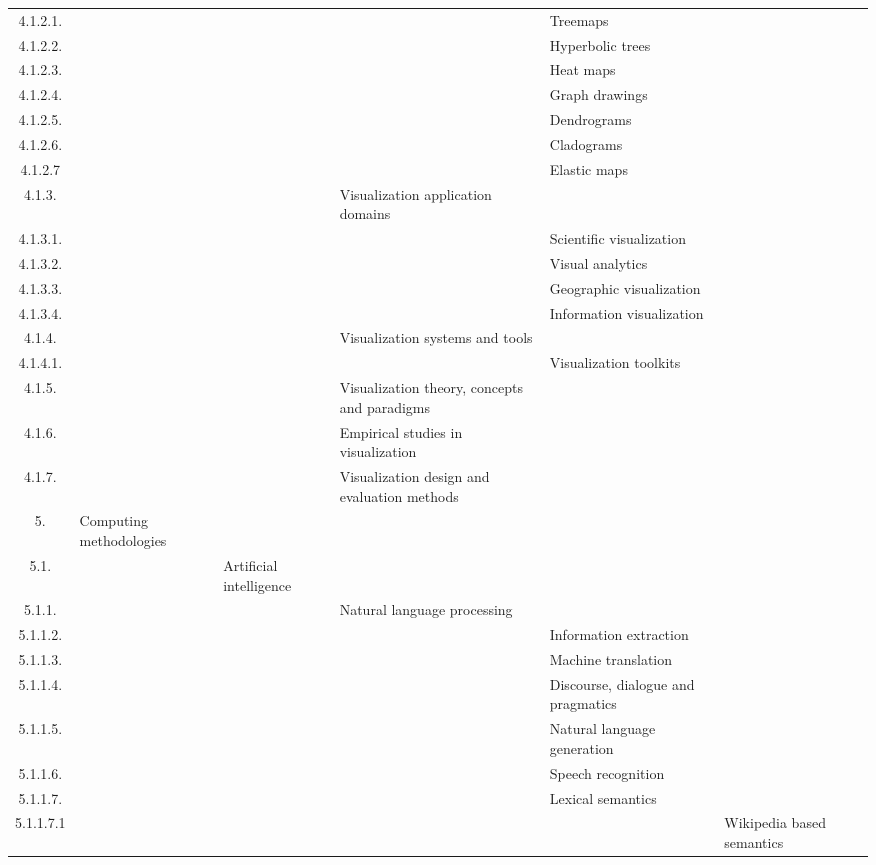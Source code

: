 \documentclass[12pt]{article}
\begin{document}
\begin{center}
{\begin{tabularx}{\linewidth}{|c|X|X|X|X|X|X|}
		4.1.2.1. &   &   &   &  Treemaps &   &   \\
		4.1.2.2. &   &   &   &  Hyperbolic trees &   &   \\
		4.1.2.3. &   &   &   &  Heat maps &   &   \\
		4.1.2.4. &   &   &   &  Graph drawings &   &   \\
		4.1.2.5. &   &   &   &  Dendrograms &   &   \\
		4.1.2.6. &   &   &   &  Cladograms &   &   \\
		4.1.2.7 &   &   &   &  Elastic maps &   &   \\
		4.1.3. &   &   &  Visualization application domains &   &   &   \\
		4.1.3.1. &   &   &   &  Scientific visualization &   &   \\
		4.1.3.2. &   &   &   &  Visual analytics &   &   \\
		4.1.3.3. &   &   &   &  Geographic visualization &   &   \\
		4.1.3.4. &   &   &   &  Information visualization &   &   \\
		4.1.4. &   &   &  Visualization systems and tools &   &   &   \\
		4.1.4.1. &   &   &   &  Visualization toolkits &   &   \\
		4.1.5. &   &   &  Visualization theory, concepts and paradigms &   &   &   \\
		4.1.6. &   &   &  Empirical studies in visualization &   &   &   \\
		4.1.7. &   &   &  Visualization design and evaluation methods &   &   &   \\
		5. &  Computing methodologies &   &   &   &   &   \\
		5.1. &   &  Artificial intelligence &   &   &   &   \\
		5.1.1. &   &   &  Natural language processing &   &   &   \\
		5.1.1.2. &   &   &   &  Information extraction &   &   \\
		5.1.1.3. &   &   &   &  Machine translation &   &   \\
		5.1.1.4. &   &   &   &  Discourse, dialogue and pragmatics &   &   \\
		5.1.1.5. &   &   &   &  Natural language generation &   &   \\
		5.1.1.6. &   &   &   &  Speech recognition &   &   \\
		5.1.1.7. &   &   &   &  Lexical semantics &   &   \\
		5.1.1.7.1 &   &   &   &   &  Wikipedia based semantics &   \\

\end{tabularx}}
\end{center}
\end{document}
